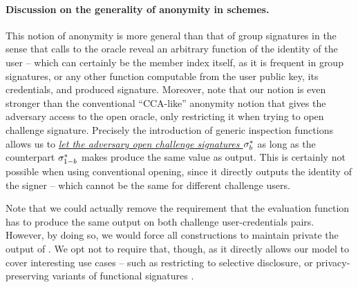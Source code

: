 \paragraph{Discussion on the generality of anonymity in \UAS schemes.} %
This notion of anonymity is more general than that of group signatures in the
sense that calls to the \INSPECT oracle reveal an arbitrary function of the
identity of the user -- which can certainly be the member index itself, as it
is frequent in group signatures, or any other function computable from the
user public key, its credentials, and produced signature. Moreover, note that
our notion is even stronger than the conventional ``CCA-like'' anonymity notion
that gives the adversary access to the open oracle, only restricting it when
trying to open challenge signature. Precisely the introduction of generic
inspection functions allows us to \uline{\emph{let the adversary open
    challenge signatures $\mathsf{\sigma}^*_b$}} as long as the counterpart $\mathsf{\sigma}^*_{1-b}$
makes \Inspect produce the same \y value as output. This is certainly not
possible when using conventional opening, since it directly outputs the identity
of the signer -- which cannot be the same for different challenge users.

Note that we could actually remove the requirement that the evaluation function
has to produce the same output on both challenge user-credentials pairs.
However, by doing so, we would force all constructions to maintain private the
output of \feval. We opt not to require that, though, as it directly allows
our model to cover interesting use cases -- such as restricting to selective
disclosure, or privacy-preserving variants of functional signatures .

